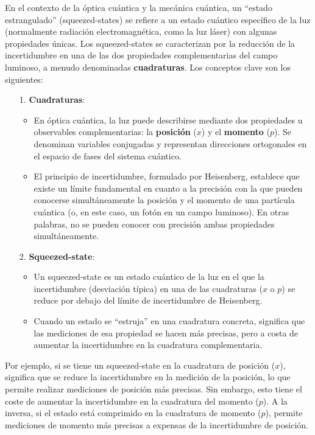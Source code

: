 \documentclass[a4paper,11pt]{book} %
\numberwithin{equation}{chapter}
\begin{document}
En el contexto de la óptica cuántica y la mecánica cuántica, un ``estado estrangulado'' (squeezed-states) se refiere a un estado cuántico específico de la luz (normalmente radiación electromagnética, como la luz láser) con algunas propiedades únicas. Los squeezed-states se caracterizan por la reducción de la incertidumbre en una de las dos propiedades complementarias del campo luminoso, a menudo denominadas \textbf{cuadraturas}. Los conceptos clave son los siguientes: 
\begin{itemize}
	\item[1.] \textbf{Cuadraturas}: 
	\begin{itemize}
		\item En óptica cuántica, la luz puede describirse mediante dos propiedades u observables complementarias: la \textbf{posición} ($x$) y el \textbf{momento} ($p$). Se denominan variables conjugadas y representan direcciones ortogonales en el espacio de fases del sistema cuántico.
		\item El principio de incertidumbre, formulado por Heisenberg, establece que existe un límite fundamental en cuanto a la precisión con la que pueden conocerse simultáneamente la posición y el momento de una partícula cuántica (o, en este caso, un fotón en un campo luminoso). En otras palabras, no se pueden conocer con precisión ambas propiedades simultáneamente.
	\end{itemize}

	\item[2.] \textbf{Squeezed-state}: 
	\begin{itemize}
		\item Un squeezed-state es un estado cuántico de la luz en el que la incertidumbre (desviación típica) en una de las cuadraturas ($x$ o $p$) se reduce por debajo del límite de incertidumbre de Heisenberg.
   		\item Cuando un estado se ``estruja'' en una cuadratura concreta, significa que las mediciones de esa propiedad se hacen más precisas, pero a costa de aumentar la incertidumbre en la cuadratura complementaria.
	\end{itemize}
	
\end{itemize}

Por ejemplo, si se tiene un squeezed-state en la cuadratura de posición ($x$), significa que se reduce la incertidumbre en la medición de la posición, lo que permite realizar mediciones de posición más precisas. Sin embargo, esto tiene el coste de aumentar la incertidumbre en la cuadratura del momento ($p$). A la inversa, si el estado está comprimido en la cuadratura de momento ($p$), permite mediciones de momento más precisas a expensas de la incertidumbre de posición.
\end{document}
